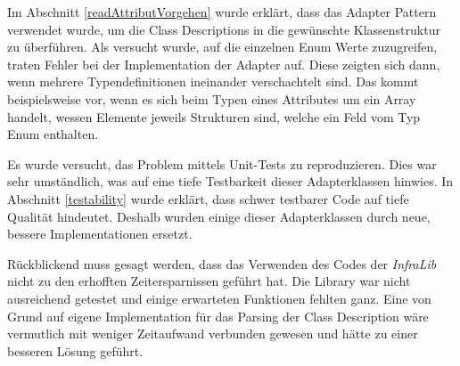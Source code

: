 Im Abschnitt \ref{readAttributVorgehen} wurde erklärt, dass das Adapter Pattern verwendet wurde, um die Class Descriptions in die gewünschte Klassenstruktur zu überführen.
Als versucht wurde, auf die einzelnen Enum Werte zuzugreifen, traten Fehler bei der Implementation der Adapter auf.
Diese zeigten sich dann, wenn mehrere Typendefinitionen ineinander verschachtelt sind.
Das kommt beispielsweise vor, wenn es sich beim Typen eines Attributes um ein Array handelt, wessen Elemente jeweils Strukturen sind, welche ein Feld vom Typ Enum enthalten.

Es wurde versucht, das Problem mittels Unit-Tests zu reproduzieren.
Dies war sehr umständlich, was auf eine tiefe Testbarkeit dieser Adapterklassen hinwies.
In Abschnitt \ref{testability} wurde erklärt, dass schwer testbarer Code auf tiefe Qualität hindeutet.
Deshalb wurden einige dieser Adapterklassen durch neue, bessere Implementationen ersetzt.

Rückblickend muss gesagt werden, dass das Verwenden des Codes der \textit{InfraLib} nicht zu den erhofften Zeitersparnissen geführt hat.
Die Library war nicht ausreichend getestet und einige erwarteten Funktionen fehlten ganz.
Eine von Grund auf eigene Implementation für das Parsing der Class Description wäre vermutlich mit weniger Zeitaufwand verbunden gewesen und hätte zu einer besseren Lösung geführt.
